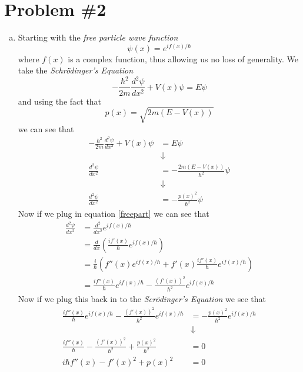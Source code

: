 \documentclass[11pt]{article}
\numberwithin{equation}{section}
\begin{document}
\section{Problem \#2}
\begin{enumerate}[(a)]
\item
Starting with the \emph{free particle wave function}
\begin{equation}
\psi(x) = e^{if(x)/\hbar}
\label{freepart}
\end{equation}
where $f(x)$ is a complex function, thus allowing us no loss of generality. We take the \emph{Schr\"{o}dinger's Equation}
$$-\frac{\hbar^2}{2m}\frac{d^2\psi}{dx^2} + V(x)\psi = E\psi$$
and using the fact that
$$p(x) = \sqrt{2m(E-V(x))}$$
we can see that 
\begin{align*}
-\frac{\hbar^2}{2m}\frac{d^2\psi}{dx^2} + V(x)\psi &= E\psi\\
&\Downarrow\\
\frac{d^2\psi}{dx^2} &= -\frac{2m(E-V(x))}{\hbar^2}\psi\\
&\Downarrow\\
\frac{d^2\psi}{dx^2} &= -\frac{p(x)^2}{\hbar^2}\psi
\end{align*}
Now if we plug in equation \ref{freepart} we can see that
\begin{align*}
\frac{d^2\psi}{dx^2} &= \frac{d^2}{dx^2}e^{if(x)/\hbar}\\
&= \frac{d}{dx}\left(\frac{if'(x)}{\hbar}e^{if(x)/\hbar}\right)\\
&= \frac{i}{\hbar}\left(f''(x)e^{if(x)/\hbar} + f'(x)\frac{if'(x)}{\hbar}e^{if(x)/\hbar}\right)\\
&= \frac{if''(x)}{\hbar}e^{if(x)/\hbar} - \frac{(f'(x))^2}{\hbar^2}e^{if(x)/\hbar}
\end{align*}
Now if we plug this back in to the \emph{Scr\"{o}dinger's Equation} we see that
\begin{align*}
\frac{if''(x)}{\hbar}e^{if(x)/\hbar} - \frac{(f'(x))^2}{\hbar^2}e^{if(x)/\hbar} &= -\frac{p(x)^2}{\hbar^2}e^{if(x)/\hbar} \\
&\Downarrow\\
\frac{if''(x)}{\hbar} - \frac{(f'(x))^2}{\hbar^2} + \frac{p(x)^2}{\hbar^2} &= 0\\
i\hbar f''(x) - f'(x)^2 + p(x)^2 &= 0
\end{align*}


\end{enumerate}
\end{document}
